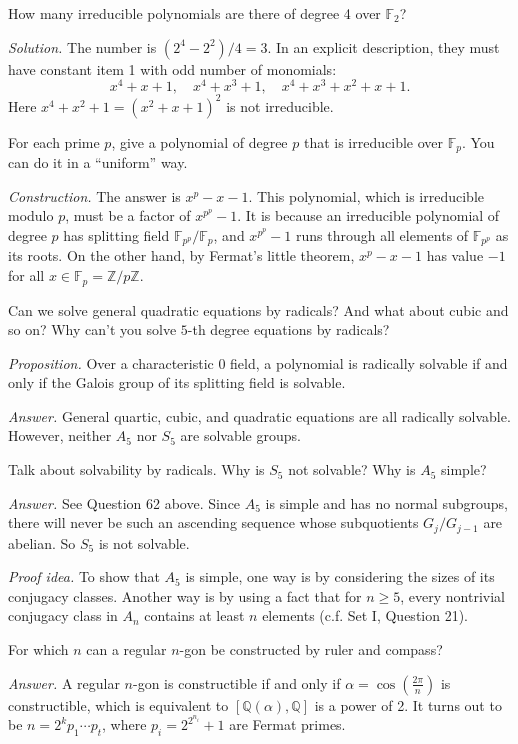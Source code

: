 \documentclass{mathproblems}
\newcommand\Q{\mathbb{Q}}
\newcommand\Z{\mathbb{Z}}
\newcommand\F{\mathbb{F}}
\begin{document}
\begin{questions}
\miquestion
{\color{blue} How many irreducible polynomials are there of degree 4 over $\F_{2}$?}

\textit{Solution.}
The number is $(2^4-2^2)/4=3$. In an explicit description, they must have constant item 1 with odd number of monomials:
$$
x^4+x+1, \quad x^4+x^3+1, \quad x^4+x^3+x^2+x+1.
$$
Here $x^4+x^2+1=(x^2+x+1)^2$ is not irreducible.

\miquestion
{\color{blue} For each prime $p$, give a polynomial of degree $p$ that is irreducible over $\F_{p}$. You can do it in a ``uniform'' way.}

\textit{Construction.} The answer is $x^p-x-1$. This polynomial, which is irreducible modulo $p$, must be a factor of $x^{p^p}-1$. It is because an irreducible polynomial of degree $p$ has splitting field $\F_{p^p}/\F_p$, and $x^{p^p}-1$ runs through all elements of $\F_{p^p}$ as its roots. On the other hand, by Fermat's little theorem, $x^p-x-1$ has value $-1$ for all $x\in \F_p=\Z/p\Z$.


\miquestion
{\color{blue} Can we solve general quadratic equations by radicals? And what about cubic and so on? Why can't you solve $5$-th degree equations by radicals?}

{\color{violet} \textit{Proposition.} Over a characteristic $0$ field, a polynomial is radically solvable if and only if the Galois group of its splitting field is solvable.}

\textit{Answer.} General quartic, cubic, and quadratic equations are all radically solvable. However, neither $A_5$ nor $S_5$ are solvable groups.

\miquestion
{\color{blue} Talk about solvability by radicals. Why is $S_{5}$ not solvable? Why is $A_{5}$ simple?}

\textit{Answer.} See Question 62 above. Since $A_5$ is simple and has no normal subgroups, there will never be such an ascending sequence whose subquotients $G_j/G_{j-1}$ are abelian. So $S_5$ is not solvable. 

\textit{Proof idea.} To show that $A_5$ is simple, one way is by considering the sizes of its conjugacy classes. Another way is by using a fact that for $n\geqslant 5$, every nontrivial conjugacy class in $A_n$ contains at least $n$ elements (c.f. Set I, Question 21).



\miquestion
{\color{blue} For which $n$ can a regular $n$-gon be constructed by ruler and compass?}

\textit{Answer.} A regular $n$-gon is constructible if and only if $\alpha = \cos(\frac{2\pi}{n})$ is constructible, which is equivalent to $[\Q(\alpha),\Q]$ is a power of 2. It turns out to be $n=2^k p_1\cdots p_t$, where $p_i=2^{2^{n_i}}+1$ are Fermat primes.


\end{questions}
\end{document}

